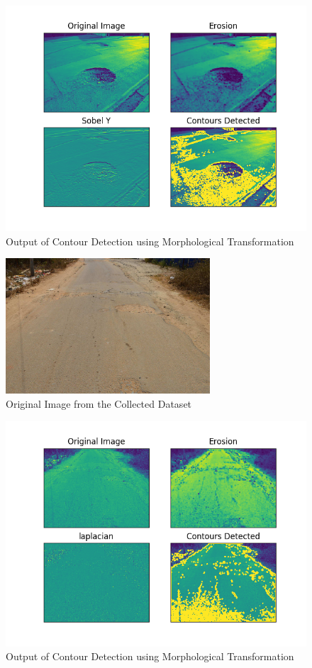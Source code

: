 \documentclass[12pt,a4paper]{article}
\begin{document}
\begin{itemize}
    \begin{figure}[ht!]
        \centering
        \includegraphics[width = 5in]{images/morph_transform_6.png}
        \caption{Output of Contour Detection using Morphological Transformation}
    \end{figure}
    \pagebreak
    
    \begin{figure}[ht!]
        \centering
        \includegraphics[width = 3in]{images/road_cam_8.jpg}
        \caption{Original Image from the Collected Dataset}
    \end{figure}

    \begin{figure}[ht!]
        \centering
        \includegraphics[width = 5in]{images/morph_transform_3.png}
        \caption{Output of Contour Detection using Morphological Transformation}
    \end{figure}
    \pagebreak
    

\end{itemize}
\end{document}
